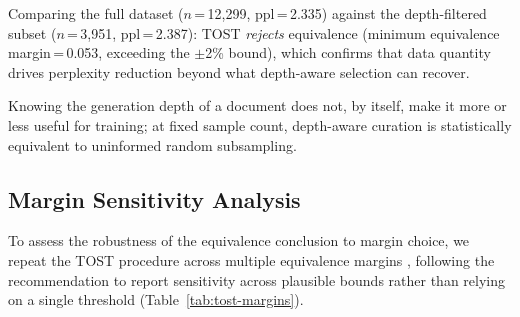 Comparing the full dataset ($n$\,=\,12{,}299, ppl\,=\,2.335) against the depth-filtered subset ($n$\,=\,3{,}951, ppl\,=\,2.387): TOST \emph{rejects} equivalence (minimum equivalence margin\,=\,0.053, exceeding the $\pm$2\% bound), which confirms that data quantity drives perplexity reduction beyond what depth-aware selection can recover.

Knowing the generation depth of a document does not, by itself, make it more or less useful for training; at fixed sample count, depth-aware curation is statistically equivalent to uninformed random subsampling.

\subsection*{Margin Sensitivity Analysis}

To assess the robustness of the equivalence conclusion to margin choice, we repeat the TOST procedure across multiple equivalence margins \cite{lakens_equivalence}, following the recommendation to report sensitivity across plausible bounds rather than relying on a single threshold (Table~\ref{tab:tost-margins}).

\begin{table}[ht]
\centering
\small
\caption{TOST equivalence testing across multiple margins. ``Equiv?'' indicates whether equivalence is established at $\alpha = 0.05$.}
\label{tab:tost-margins}
\end{table}

